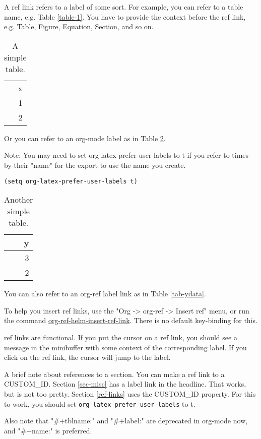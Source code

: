\documentclass[11pt]{article}
\begin{document}
A ref link refers to a label of some sort. For example, you can refer to a table name, e.g. Table \ref{table-1}. You have to provide the context before the ref link, e.g. Table, Figure, Equation, Section, and so on.

\begin{table}[htbp]
\caption{\label{tab:org65c5fdf}A simple table.}
\centering
\begin{tabular}{r}
x\\
1\\
2\\
\end{tabular}
\end{table}

Or you can refer to an org-mode label as in Table \ref{table-3}.


Note: You may need to set org-latex-prefer-user-labels to t if you refer to times by their "name" for the export to use the name you create.

\begin{verbatim}
(setq org-latex-prefer-user-labels t)
\end{verbatim}


\begin{table}[htbp]
\caption{Another simple table. \label{table-3}}
\centering
\begin{tabular}{r}
y\\
\hline
3\\
2\\
\end{tabular}
\end{table}

You can also refer to an org-ref label link as in Table \ref{tab-ydata}.

To help you insert ref links, use the "Org -> org-ref -> Insert ref" menu, or run the command \url{org-ref-helm-insert-ref-link}. There is no default key-binding for this.

ref links are functional. If you put the cursor on a ref link, you should see a message in the minibuffer with some context of the corresponding label. If you click on the ref link, the cursor will jump to the label.

A brief note about references to a section. You can make a ref link to a CUSTOM\_ID. Section \ref{sec-misc} has a label link in the headline. That works, but is not too pretty. Section \ref{ref-links} uses the CUSTOM\_ID property. For this to work, you should set \texttt{org-latex-prefer-user-labels} to t.

Also note that "\#+tblname:" and "\#+label:" are deprecated in org-mode now, and "\#+name:" is preferred.
\end{document}
